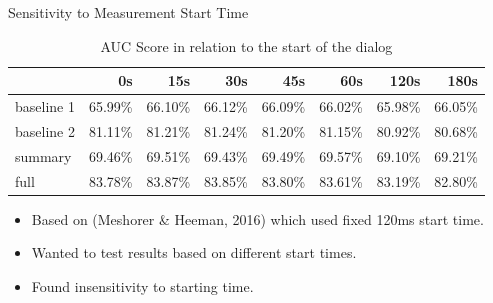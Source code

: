 \begin{frame} {Sensitivity to Measurement Start Time}
\begin{table}
\begin{center}
\begin{tabular}{lrrrrrrr}
\hline
{} & 0s & 15s & 30s & 45s & 60s & {\bf 120s} & 180s  \\
\hline
baseline 1 & 65.99\% & 66.10\% & 66.12\% & 66.09\%  & 66.02\% & 65.98\% & 66.05\%  \\
baseline 2 & 81.11\% & 81.21\% & 81.24\% & 81.20\%  & 81.15\% & 80.92\% & 80.68\%  \\
summary    & 69.46\% & 69.51\% & 69.43\% & 69.49\%  & 69.57\% & 69.10\% & 69.21\%  \\
full       & 83.78\% & 83.87\% & 83.85\% & 83.80\%  & 83.61\% & 83.19\% & 82.80\%  \\
\hline
\end{tabular}
\end{center}
\caption{ AUC Score in relation to the start of the dialog }
\label{table:starttime}
\end{table}
\begin{itemize}
    \item Based on (Meshorer \& Heeman, 2016) which used fixed 120ms start time.
    \item Wanted to test results based on different start times.
    \item Found insensitivity to starting time.     
  \end{itemize}

\end{frame}{}
